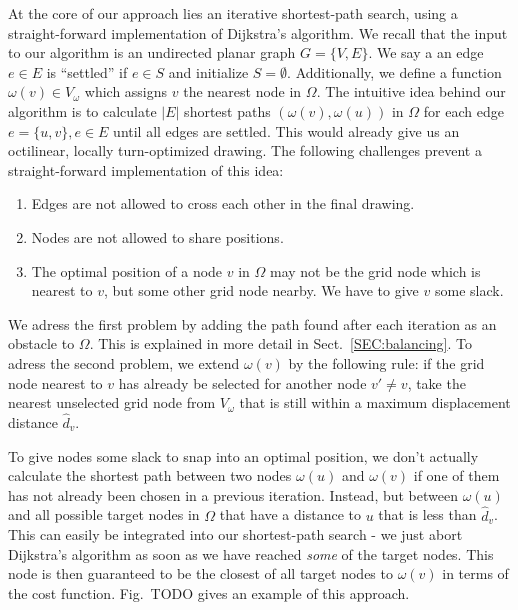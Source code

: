 \documentclass{sig-alternate-sigmod09}
\begin{document}
At the core of our approach lies an iterative shortest-path search, using a straight-forward implementation of Dijkstra's algorithm. We recall that the input to our algorithm is an undirected planar graph $G = \{V, E\}$. We say a an edge $e \in E$ is ``settled'' if $e \in S$ and initialize $S = \emptyset$. Additionally, we define a function $\omega(v) \in V_\omega$ which assigns $v$ the nearest node in $\Omega$.  The intuitive idea behind our algorithm is to calculate
$|E|$ shortest paths $\left(\omega\left(v\right), \omega\left(u\right)\right)$ in $\Omega$ for each edge $e = \{u, v\}, e \in E$ until all edges are settled. This would already give us an octilinear, locally turn-optimized drawing. The following challenges prevent a straight-forward implementation of this idea:
\begin{enumerate}
\item Edges are not allowed to cross each other in the final drawing.
\item Nodes are not allowed to share positions.
\item The optimal position of a node $v$ in $\Omega$ may not be the grid node which is nearest to $v$, but some other grid node nearby. We have to give $v$ some slack.
\end{enumerate}

We adress the first problem by adding the path found after each iteration as an obstacle to $\Omega$. This is explained in more detail in Sect.~\ref{SEC:balancing}. To adress the second problem, we extend $\omega(v)$ by the following rule: if the grid node nearest to $v$ has already be selected for another node $v' \neq v$, take the nearest unselected grid node from $V_\omega$ that is still within a maximum displacement distance $\hat d_v$.


To give nodes some slack to snap into an optimal position, we don't actually calculate the shortest path between two nodes $\omega(u)$ and $\omega(v)$ if one of them has not already been chosen in a previous iteration. Instead, but between $\omega(u)$ and all possible target nodes in $\Omega$ that have a distance to $u$ that is less than $\hat d_v$. This can easily be integrated into our shortest-path search - we just abort Dijkstra's algorithm as soon as we have reached \emph{some} of the target nodes. This node is then guaranteed to be the closest of all target nodes to $\omega(v)$ in terms of the cost function. Fig.~TODO gives an example of this approach.
\end{document}
